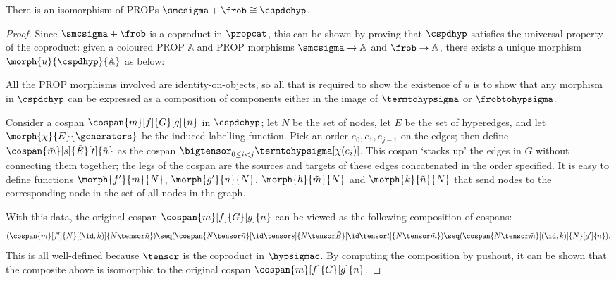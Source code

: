 \begin{theorem}\label{thm:isomorphism-smcfrob-cospans}
    There is an isomorphism of PROPs \(\smcsigma + \frob \cong \cspdchyp\).
\end{theorem}
\begin{proof}
    Since \(\smcsigma + \frob\) is a coproduct in \(\propcat\), this can be
    shown by proving that \(\cspdhyp\) satisfies the universal property of the
    coproduct: given a coloured PROP \(\mathbb{A}\) and PROP morphisms
    \(\smcsigma \to \mathbb{A}\) and \(\frob \to \mathbb{A}\), there exists
    a unique morphism \(\morph{u}{\cspdhyp}{\mathbb{A}}\) as below:

    \begin{center}
        
    \end{center}
    All the PROP morphisms involved are identity-on-objects, so all that is
    required to show the existence of \(u\) is to show that any morphism in
    \(\cspdchyp\) can be expressed as a composition of components either in the
    image of \(\termtohypsigma\) or \(\frobtohypsigma\).

    Consider a cospan \(\cospan{m}[f]{G}[g]{n}\) in \(\cspdchyp\); let \(N\) be
    the set of nodes, let \(E\) be the set of hyperedges, and let
    \(\morph{\chi}{E}{\generators}\) be the induced labelling function.
    Pick an order \(e_0, e_1, e_{j-1}\) on the edges; then define \(
    \cospan{\tilde{m}}[s]{\tilde{E}}[t]{\tilde{n}}
    \) as the cospan \(
    \bigtensor_{0 \leq i < j}
    \termtohypsigma[\chi(e_i)]
    \).
    This cospan `stacks up' the edges in \(G\) without connecting them together;
    the legs of the cospan are the sources and targets of these
    edges concatenated in the order specified.
    It is easy to define functions \(\morph{f^\prime}{m}{N}\),
    \(\morph{g^\prime}{n}{N}\), \(\morph{h}{\tilde{m}}{N}\) and
    \(\morph{k}{\tilde{n}}{N}\) that send nodes to the corresponding node in the
    set of all nodes in the graph.

    With this data, the original cospan \(\cospan{m}[f]{G}[g]{n}\) can be
    viewed as the following composition of cospans: \[
        (
        \cospan{m}[f^\prime]{N}[(\id,h)]{N \tensor \tilde{n}}
        ) \seq (
        \cospan{
            N \tensor \tilde{n}
        }[
            \id \tensor s
        ]{
            N \tensor \tilde{E}
        }[
            \id \tensor t
        ]{
            N \tensor \tilde{m}
        }
        ) \seq (
        \cospan{N \tensor \tilde{m}}[(\id, k)]{N}[g^\prime]{n}
        ).
    \]
    This is all well-defined because \(\tensor\) is the coproduct in
    \(\hypsigmac\).
    By computing the composition by pushout, it can be shown that the composite
    above is isomorphic to the original cospan \(\cospan{m}[f]{G}[g]{n}\).


\end{proof}

